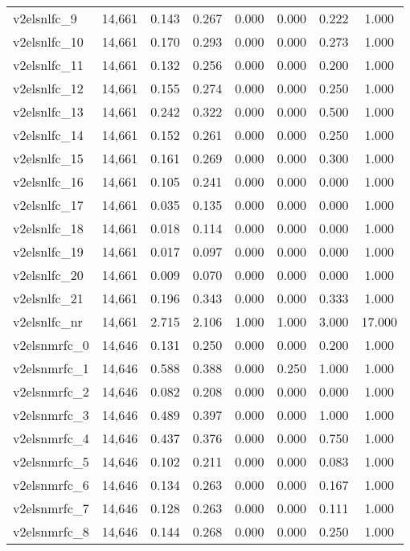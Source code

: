 \begin{table}[!htbp]
\begin{tabular}{@{\extracolsep{5pt}}lccccccc}
v2elsnlfc\_9 & 14,661 & 0.143 & 0.267 & 0.000 & 0.000 & 0.222 & 1.000 \\ 
v2elsnlfc\_10 & 14,661 & 0.170 & 0.293 & 0.000 & 0.000 & 0.273 & 1.000 \\ 
v2elsnlfc\_11 & 14,661 & 0.132 & 0.256 & 0.000 & 0.000 & 0.200 & 1.000 \\ 
v2elsnlfc\_12 & 14,661 & 0.155 & 0.274 & 0.000 & 0.000 & 0.250 & 1.000 \\ 
v2elsnlfc\_13 & 14,661 & 0.242 & 0.322 & 0.000 & 0.000 & 0.500 & 1.000 \\ 
v2elsnlfc\_14 & 14,661 & 0.152 & 0.261 & 0.000 & 0.000 & 0.250 & 1.000 \\ 
v2elsnlfc\_15 & 14,661 & 0.161 & 0.269 & 0.000 & 0.000 & 0.300 & 1.000 \\ 
v2elsnlfc\_16 & 14,661 & 0.105 & 0.241 & 0.000 & 0.000 & 0.000 & 1.000 \\ 
v2elsnlfc\_17 & 14,661 & 0.035 & 0.135 & 0.000 & 0.000 & 0.000 & 1.000 \\ 
v2elsnlfc\_18 & 14,661 & 0.018 & 0.114 & 0.000 & 0.000 & 0.000 & 1.000 \\ 
v2elsnlfc\_19 & 14,661 & 0.017 & 0.097 & 0.000 & 0.000 & 0.000 & 1.000 \\ 
v2elsnlfc\_20 & 14,661 & 0.009 & 0.070 & 0.000 & 0.000 & 0.000 & 1.000 \\ 
v2elsnlfc\_21 & 14,661 & 0.196 & 0.343 & 0.000 & 0.000 & 0.333 & 1.000 \\ 
v2elsnlfc\_nr & 14,661 & 2.715 & 2.106 & 1.000 & 1.000 & 3.000 & 17.000 \\ 
v2elsnmrfc\_0 & 14,646 & 0.131 & 0.250 & 0.000 & 0.000 & 0.200 & 1.000 \\ 
v2elsnmrfc\_1 & 14,646 & 0.588 & 0.388 & 0.000 & 0.250 & 1.000 & 1.000 \\ 
v2elsnmrfc\_2 & 14,646 & 0.082 & 0.208 & 0.000 & 0.000 & 0.000 & 1.000 \\ 
v2elsnmrfc\_3 & 14,646 & 0.489 & 0.397 & 0.000 & 0.000 & 1.000 & 1.000 \\ 
v2elsnmrfc\_4 & 14,646 & 0.437 & 0.376 & 0.000 & 0.000 & 0.750 & 1.000 \\ 
v2elsnmrfc\_5 & 14,646 & 0.102 & 0.211 & 0.000 & 0.000 & 0.083 & 1.000 \\ 
v2elsnmrfc\_6 & 14,646 & 0.134 & 0.263 & 0.000 & 0.000 & 0.167 & 1.000 \\ 
v2elsnmrfc\_7 & 14,646 & 0.128 & 0.263 & 0.000 & 0.000 & 0.111 & 1.000 \\ 
v2elsnmrfc\_8 & 14,646 & 0.144 & 0.268 & 0.000 & 0.000 & 0.250 & 1.000 \\ 

\end{tabular}
\end{table}
